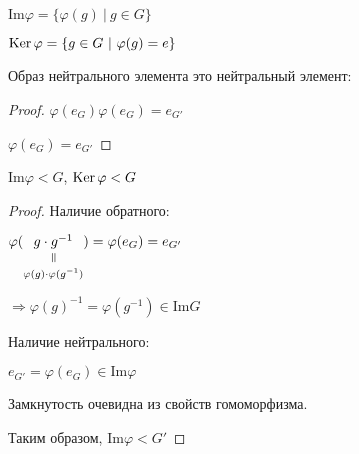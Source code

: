 \begin{conj}
  $\mathrm{Im}{\varphi} = \{ \varphi(g)\ |\ g\in G \}$

  $\operatorname{Ker}{\varphi} = \{ g \in G\ |\ \varphi(g) = e \}$
\end{conj}

\begin{theorem-non}
  Образ нейтрального элемента это нейтральный элемент:

  \begin{proof}
    $\varphi(e_G)\varphi(e_G) = e_{G'}$

    $\varphi(e_G) = e_{G'}$
  \end{proof}
\end{theorem-non}

\begin{theorem-non}
  $\mathrm{Im}{\varphi} < G$, $\operatorname{Ker}{\varphi} < G$
  \begin{proof}
    Наличие обратного:

    $\varphi(\equalto{g \cdot g^{-1}}{\varphi(g)\cdot \varphi(g^{-1})}) = \varphi(e_G) = e_{G'}$
    
    $\Longrightarrow \varphi(g)^{-1} = \varphi(g^{-1}) \in \mathrm{Im}{G}$

    Наличие нейтрального:

    $e_{G'} = \varphi(e_G) \in \mathrm{Im}{\varphi}$

    Замкнутость очевидна из свойств гомоморфизма. 

    Таким образом, $\mathrm{Im}{\varphi} < G'$
  \end{proof}
\end{theorem-non}
